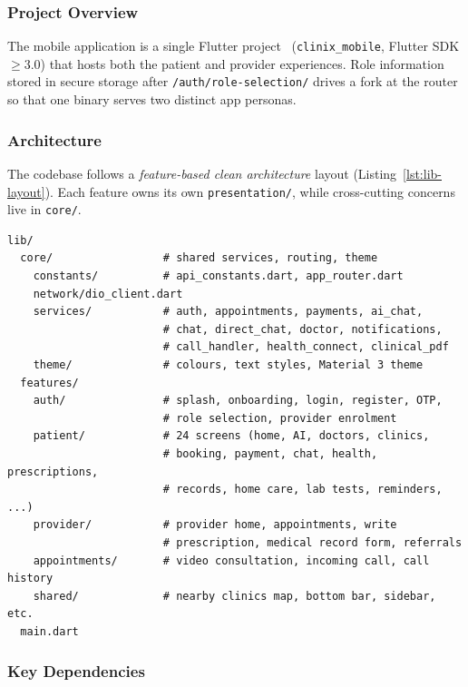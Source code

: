 \subsubsection*{Project Overview}

The mobile application is a single Flutter project~\cite{flutter_docs} (\texttt{clinix\_mobile}, Flutter SDK $\geq 3.0$) that hosts both the patient and provider experiences. Role information stored in secure storage after \texttt{/auth/role-selection/} drives a fork at the router so that one binary serves two distinct app personas.

\subsubsection*{Architecture}

The codebase follows a \emph{feature-based clean architecture} layout (Listing~\ref{lst:lib-layout}). Each feature owns its own \texttt{presentation/}, while cross-cutting concerns live in \texttt{core/}.

\begin{lstlisting}[caption={Top-level layout of \texttt{lib/}}, label={lst:lib-layout}]
lib/
  core/                 # shared services, routing, theme
    constants/          # api_constants.dart, app_router.dart
    network/dio_client.dart
    services/           # auth, appointments, payments, ai_chat,
                        # chat, direct_chat, doctor, notifications,
                        # call_handler, health_connect, clinical_pdf
    theme/              # colours, text styles, Material 3 theme
  features/
    auth/               # splash, onboarding, login, register, OTP,
                        # role selection, provider enrolment
    patient/            # 24 screens (home, AI, doctors, clinics,
                        # booking, payment, chat, health, prescriptions,
                        # records, home care, lab tests, reminders, ...)
    provider/           # provider home, appointments, write
                        # prescription, medical record form, referrals
    appointments/       # video consultation, incoming call, call history
    shared/             # nearby clinics map, bottom bar, sidebar, etc.
  main.dart
\end{lstlisting}

\subsubsection*{Key Dependencies}

